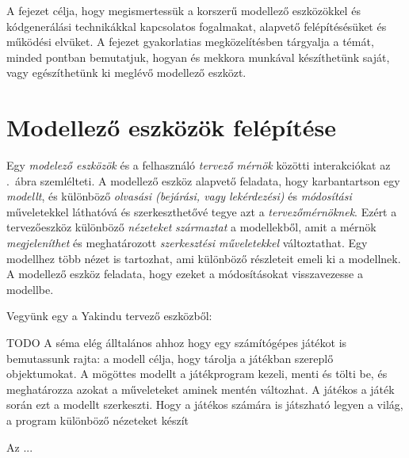 \graphicspath{ {./kodgeneralas/figures/} }

A fejezet célja, hogy megismertessük a korszerű modellező eszközökkel és kódgenerálási technikákkal kapcsolatos fogalmakat, alapvető felépítésésüket és működési elvüket.
A fejezet gyakorlatias megközelítésben tárgyalja a témát, minded pontban bemutatjuk, hogyan és mekkora munkával készíthetünk saját, vagy egészíthetünk ki meglévő modellező eszközt.

\section{Modellező eszközök felépítése}
Egy \emph{modelező eszközök} és a felhasználó \emph{tervező mérnök} közötti interakciókat az .~ábra szemlélteti. A modellező eszköz alapvető feladata, hogy karbantartson egy \emph{modellt}, és különböző \emph{olvasási (bejárási, vagy lekérdezési)} és \emph{módosítási} műveletekkel láthatóvá és szerkeszthetővé tegye azt a \emph{tervezőmérnöknek}. Ezért a tervezőeszköz különböző \emph{nézeteket} \emph{származtat} a modellekből, amit a mérnök \emph{megjeleníthet} és meghatározott \emph{szerkesztési műveletekkel} változtathat. Egy modellhez több nézet is tartozhat, ami különböző részleteit emeli ki a modellnek. A modellező eszköz feladata, hogy ezeket a módosításokat visszavezesse a modellbe.


\begin{pelda}
Vegyünk egy a Yakindu tervező eszközből: 
\end{pelda}

\begin{pelda}TODO
A séma elég álltalános ahhoz hogy egy számítógépes játékot is bemutassunk rajta: a modell célja, hogy tárolja a játékban szereplő objektumokat. A mögöttes modellt a játékprogram kezeli, menti és tölti be, és meghatározza azokat a műveleteket aminek mentén változhat. A játékos a játék során ezt a modellt szerkeszti. Hogy a játékos számára is játszható legyen a világ, a program különböző nézeteket készít
\end{pelda}

\begin{definicio}
	Az  ...
\end{definicio}

